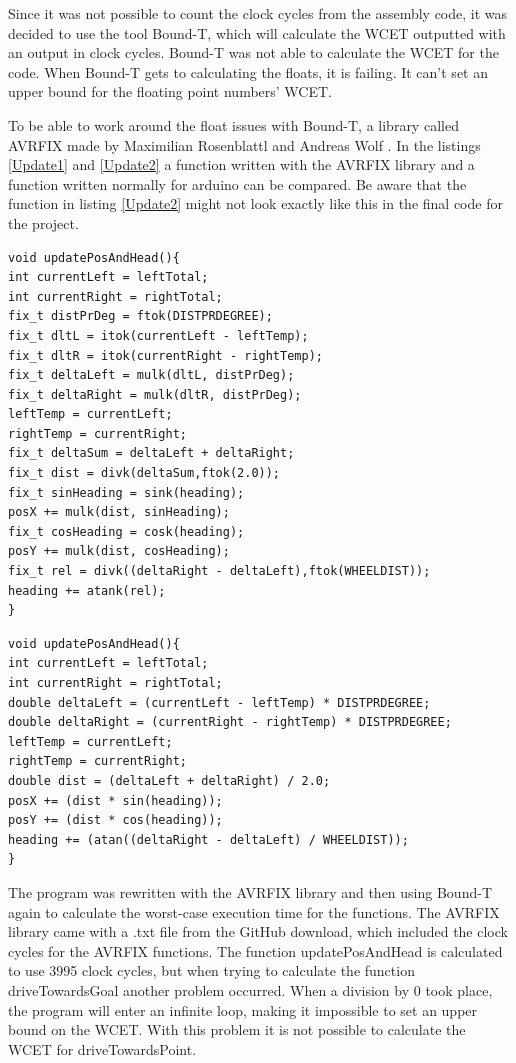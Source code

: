 Since it was not possible to count the clock cycles from the assembly code, it was decided to use the tool Bound-T, which will calculate the WCET outputted with an output in clock cycles. \newline
Bound-T was not able to calculate the WCET for the code. When Bound-T gets to calculating the floats, it is failing. It can't set an upper bound for the floating point numbers' WCET.

To be able to work around the float issues with Bound-T, a library called AVRFIX made by Maximilian Rosenblattl and Andreas Wolf \citep{AVRFIX}. In the listings \ref{Update1} and \ref{Update2} a function written with the AVRFIX library and a function written normally for arduino can be compared. Be aware that the function in listing \ref{Update2} might not look exactly like this in the final code for the project. 

\begin{lstlisting}[caption={The function updatePosAndHead with AWRFIX library}, label={Update1}]
void updatePosAndHead(){
int currentLeft = leftTotal;
int currentRight = rightTotal;
fix_t distPrDeg = ftok(DISTPRDEGREE);
fix_t dltL = itok(currentLeft - leftTemp);
fix_t dltR = itok(currentRight - rightTemp);
fix_t deltaLeft = mulk(dltL, distPrDeg);
fix_t deltaRight = mulk(dltR, distPrDeg);
leftTemp = currentLeft;
rightTemp = currentRight;
fix_t deltaSum = deltaLeft + deltaRight;
fix_t dist = divk(deltaSum,ftok(2.0));
fix_t sinHeading = sink(heading);
posX += mulk(dist, sinHeading);
fix_t cosHeading = cosk(heading);
posY += mulk(dist, cosHeading);
fix_t rel = divk((deltaRight - deltaLeft),ftok(WHEELDIST));
heading += atank(rel);
}
\end{lstlisting}

\begin{lstlisting}[caption={The function updatePosAndHead from the Arduino IDE}, label={Update2}]
void updatePosAndHead(){
int currentLeft = leftTotal;
int currentRight = rightTotal;
double deltaLeft = (currentLeft - leftTemp) * DISTPRDEGREE;
double deltaRight = (currentRight - rightTemp) * DISTPRDEGREE;
leftTemp = currentLeft;
rightTemp = currentRight;
double dist = (deltaLeft + deltaRight) / 2.0;
posX += (dist * sin(heading));
posY += (dist * cos(heading));
heading += (atan((deltaRight - deltaLeft) / WHEELDIST));
}
\end{lstlisting}

The program was rewritten with the AVRFIX library and then using Bound-T again to calculate the worst-case execution time for the functions. The AVRFIX library came with a .txt file from the GitHub download, which included the clock cycles for the AVRFIX functions. \newline
The function updatePosAndHead is calculated to use 3995 clock cycles, but when trying to calculate the function driveTowardsGoal another problem occurred. When a division by 0 took place, the program will enter an infinite loop, making it impossible to set an upper bound on the WCET. With this problem it is not possible to calculate the WCET for driveTowardsPoint.

